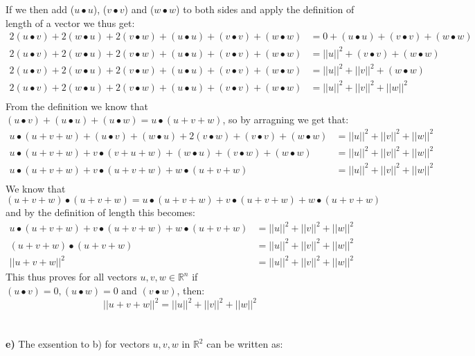 \documentclass[11pt]{article}
\begin{document}
If we then add ($u \bullet u$), ($v \bullet v$) and ($w \bullet w$) to both sides and apply the definition of length of a vector we thus get:
\begin{align*}
2(u \bullet v)  + 2(w \bullet u) + 2(v \bullet w) + (u \bullet u) + (v \bullet v) + (w \bullet w) &= 0 + (u \bullet u) + (v \bullet v) + (w \bullet w)\\
2(u \bullet v)  + 2(w \bullet u) + 2(v \bullet w) + (u \bullet u) + (v \bullet v) + (w \bullet w) &= ||u||^2 + (v \bullet v) + (w \bullet w)\\
2(u \bullet v)  + 2(w \bullet u) + 2(v \bullet w) + (u \bullet u) + (v \bullet v) + (w \bullet w) &= ||u||^2 + ||v||^2 + (w \bullet w)\\
2(u \bullet v)  + 2(w \bullet u) + 2(v \bullet w) + (u \bullet u) + (v \bullet v) + (w \bullet w) &= ||u||^2 + ||v||^2 + ||w||^2\\
\end{align*}
From the definition we know that $(u \bullet v) + (u \bullet u) + (u \bullet w)  = u \bullet ( u+ v + w)$, so by arragning we get that:
\begin{align*}
u \bullet (u+v +w)  + (u \bullet v)  + (w \bullet u) + 2(v \bullet w) + (v \bullet v) + (w \bullet w) &= ||u||^2 + ||v||^2 + ||w||^2\\
u \bullet (u+v +w)  + v \bullet(v + u + w)  + (w \bullet u) + (v \bullet w) + (w \bullet w) &= ||u||^2 + ||v||^2 + ||w||^2\\
u \bullet (u+v +w)  + v \bullet(u + v + w)  + w \bullet (u + v + w)  &= ||u||^2 + ||v||^2 + ||w||^2\\
\end{align*}
We know that $(u+v+w) \bullet (u + v + w) = u \bullet (u+v +w)  + v \bullet(u + v + w)  + w \bullet (u + v + w)$ and by the definition of length this becomes:
\begin{align*}
u \bullet (u+v +w)  + v \bullet(u + v + w)  + w \bullet (u + v + w)  &= ||u||^2 + ||v||^2 + ||w||^2\\
(u+v+w) \bullet (u+v +w)   &= ||u||^2 + ||v||^2 + ||w||^2\\
||u+v +w||^2   &= ||u||^2 + ||v||^2 + ||w||^2
\end{align*}
This thus proves for all vectors $u,v,w \in \mathbb{R}^n$ if $(u \bullet v) = 0, (u \bullet w) = 0 \text{ and } (v \bullet w)$, then:
\[||u+v +w||^2   = ||u||^2 + ||v||^2 + ||w||^2\]\\\\
\textbf{e)} The exsention to b) for vectors $u,v,w$ in $\mathbb{R}^2$ can be written as:
\end{document}
